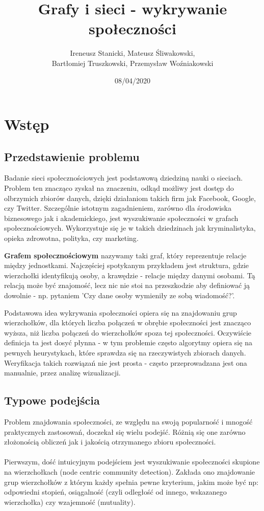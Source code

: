 \documentclass{article}
\title{Grafy i sieci - wykrywanie społeczności}
\date{08/04/2020}
\author{Ireneusz Stanicki, Mateusz Śliwakowski,\\Bartłomiej Truszkowski, Przemysław Woźniakowski}
\begin{document}
	\begin{titlingpage}
		\maketitle
	\end{titlingpage}

\tableofcontents
\newpage

\section{Wstęp}
\subsection{Przedstawienie problemu}
Badanie sieci społecznościowych jest podstawową dziedziną nauki o sieciach. Problem ten znacząco zyskał na znaczeniu, odkąd możliwy jest dostęp do olbrzymich zbiorów danych, dzięki działaniom takich firm jak Facebook, Google, czy Twitter. Szczególnie istotnym zagadnieniem, zarówno dla środowiska biznesowego jak i akademickiego, jest wyszukiwanie społeczności w grafach społecznościowych. Wykorzystuje się je w takich dziedzinach jak kryminalistyka, opieka zdrowotna, polityka, czy marketing\cite{ms-paper1}.

\textbf{Grafem społecznościowym} nazywamy taki graf, który reprezentuje relacje między jednostkami. Najczęściej spotykanym przykładem jest struktura, gdzie wierzchołki identyfikują osoby, a krawędzie - relacje między danymi osobami. Tą relacją może być znajomość, lecz nic nie stoi na przeszkodzie aby definiować ją dowolnie - np. pytaniem 'Czy dane osoby wymieniły ze sobą wiadomość?'.

Podstawowa idea wykrywania społeczności opiera się na znajdowaniu grup wierzchołków, dla których liczba połączeń w obrębie społeczności jest znacząco wyższa, niż liczba połączeń do wierzchołków spoza tej społeczności. Oczywiście definicja ta jest dosyć płynna - w tym problemie często algorytmy opiera się na pewnych heurystykach, które sprawdza się na rzeczywistych zbiorach danych. Weryfikacja takich rozwiązań nie jest prosta - często przeprowadzana jest ona manualnie, przez analizę wizualizacji. 

\subsection{Typowe podejścia}
Problem znajdowania społeczności, ze względu na swoją popularność i mnogość praktycznych zastosowań, doczekał się wielu podejść. Różnią się one zarówno złożonością obliczeń jak i jakością otrzymanego zbioru społeczności.
\\ \\ 
Pierwszym, dość intuicyjnym podejściem jest wyszukiwanie społeczności skupione na wierzchołkach (node centric community detection). Zakłada ono znajdowanie grup wierzchołków z którym każdy spełnia pewne kryterium, jakim może być np: odpowiedni stopień, osiągalność (czyli odległość od innego, wskazanego wierzchołka) czy wzajemność (mutuality).
\end{document}

